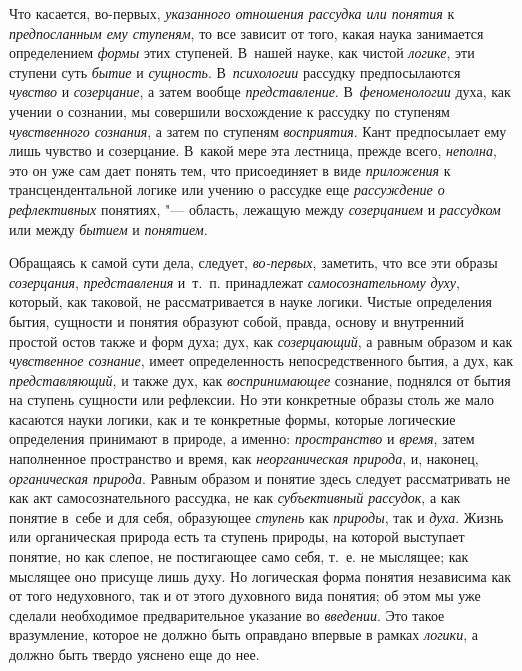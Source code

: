 Что касается, во-первых, {\em указанного отношения рассудка или понятия}
к {\em предпосланным ему ступеням}, то все зависит от того, какая наука
занимается определением {\em формы} этих ступеней. В~нашей науке, как
чистой {\em логике}, эти ступени суть {\em бытие} и {\em сущность}.
В~{\em психологии} рассудку предпосылаются {\em чувство} и
{\em созерцание}, а затем вообще {\em представление}. В~{\em феноменологии}
духа, как учении о сознании, мы совершили восхождение к рассудку по
ступеням {\em чувственного сознания}, а затем по ступеням
{\em восприятия}. Кант предпосылает ему лишь чувство и созерцание. В~какой
мере эта лестница, прежде всего, {\em неполна}, это он уже сам дает
понять тем, что присоединяет в виде {\em приложения} к трансцендентальной
логике или учению о рассудке еще {\em рассуждение о рефлективных}
понятиях, "--- область, лежащую между {\em созерцанием} и {\em рассудком}
или между {\em бытием} и {\em понятием}.

Обращаясь к самой сути дела, следует, {\em во-первых},
заметить, что все эти образы {\em созерцания}, {\em представления}
и~т.~п. принадлежат {\em самосознательному духу},
который, как таковой, не рассматривается в науке логики.
Чистые определения бытия, сущности и понятия образуют собой, правда, основу
и внутренний простой остов также и форм духа; дух, как
{\em созерцающий}, а равным образом и как {\em чувственное сознание},
имеет определенность непосредственного бытия, а дух, как {\em представляющий},
и также дух, как {\em воспринимающее}
сознание, поднялся от бытия на ступень сущности или
рефлексии. Но эти конкретные образы столь же мало касаются науки логики,
как и те конкретные формы, которые логические определения принимают в
природе, а именно: {\em пространство} и {\em время},
затем наполненное пространство и время, как
{\em неорганическая природа}, и, наконец, {\em органическая природа}.
Равным образом и понятие здесь следует рассматривать не как
акт самосознательного рассудка, не как {\em субъективный рассудок},
а как понятие в~себе и для себя, образующее {\em ступень} как
{\em природы}, так и {\em духа}. Жизнь или
органическая природа есть та ступень природы, на которой выступает понятие,
но как слепое, не постигающее само себя, т.~е. не мыслящее; как мыслящее
оно присуще лишь духу. Но логическая форма понятия независима как от того
недуховного, так и от этого духовного вида понятия; об этом мы уже сделали
необходимое предварительное указание во {\em введении}. Это такое
вразумление, которое не должно быть оправдано впервые в рамках
{\em логики}, а должно быть твердо уяснено еще до нее.

